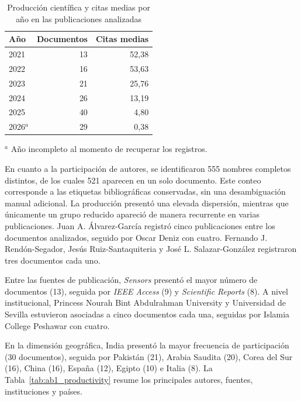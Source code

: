 \documentclass[pdflatex,sn-mathphys-num]{sn-jnl}%
\theoremstyle{thmstyleone}%
\theoremstyle{thmstyletwo}%
\theoremstyle{thmstylethree}%
\begin{document}
\begin{table}[htbp]
\caption{Producción científica y citas medias por año en las publicaciones analizadas}
\label{tab:bq_annual}
\centering
\small
\begin{tabular}{@{}lrr@{}}
\toprule
\textbf{Año} & \textbf{Documentos} & \textbf{Citas medias} \\
\midrule
2021 & 13 & 52,38 \\
2022 & 16 & 53,63 \\
2023 & 21 & 25,76 \\
2024 & 26 & 13,19 \\
2025 & 40 & 4,80 \\
2026$^{a}$ & 29 & 0,38 \\
\bottomrule
\end{tabular}

\begin{flushleft}
\footnotesize $^{a}$ Año incompleto al momento de recuperar los registros.
\end{flushleft}
\end{table}
\FloatBarrier

\FloatBarrier
En cuanto a la participación de autores, se identificaron 555 nombres completos distintos, de los cuales 521 aparecen en un solo documento. Este conteo corresponde a las etiquetas bibliográficas conservadas, sin una desambiguación manual adicional. La producción presentó una elevada
dispersión, mientras que
únicamente un grupo reducido apareció de manera recurrente en varias publicaciones.
Juan A. Álvarez-García registró cinco publicaciones entre los documentos analizados, seguido por
Oscar Deniz con cuatro. Fernando J. Rendón-Segador, Jesús Ruiz-Santaquiteria
y José L. Salazar-González registraron tres documentos cada uno.

Entre las fuentes de publicación, \textit{Sensors} presentó el mayor número de
documentos (13), seguida por \textit{IEEE Access} (9) y
\textit{Scientific Reports} (8). A nivel institucional, Princess Nourah Bint
Abdulrahman University y Universidad de Sevilla estuvieron asociadas a cinco
documentos cada una, seguidas por Islamia College Peshawar con cuatro.

En la dimensión geográfica, India presentó la mayor frecuencia de participación
(30 documentos), seguida por Pakistán (21), Arabia Saudita (20), Corea del Sur
(16), China (16), España (12), Egipto (10) e Italia (8). La Tabla~\ref{tab:ab1_productivity}
resume los principales autores, fuentes, instituciones y países.
\end{document}
